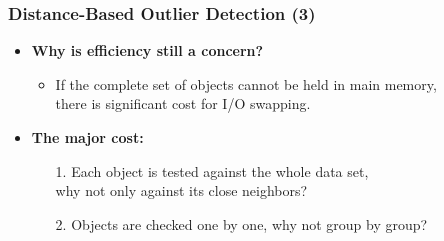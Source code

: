 \begin{frame}
  \frametitle{Distance-Based Outlier Detection (3)}
  \begin{itemize}
  \item \textbf{Why is efficiency still a concern?}
    \begin{itemize}
    \item If the complete set of objects cannot be held in main memory, \\
      there is significant cost for I/O swapping.
    \end{itemize}
  \item \textbf{The major cost:}
    \begin{itemize}
    \item[1.] Each object is tested against the whole data set, \\
      why not only against its close neighbors?
    \item[2.] Objects are checked one by one, why not group by group?
    \end{itemize}
  \end{itemize}
\end{frame}


